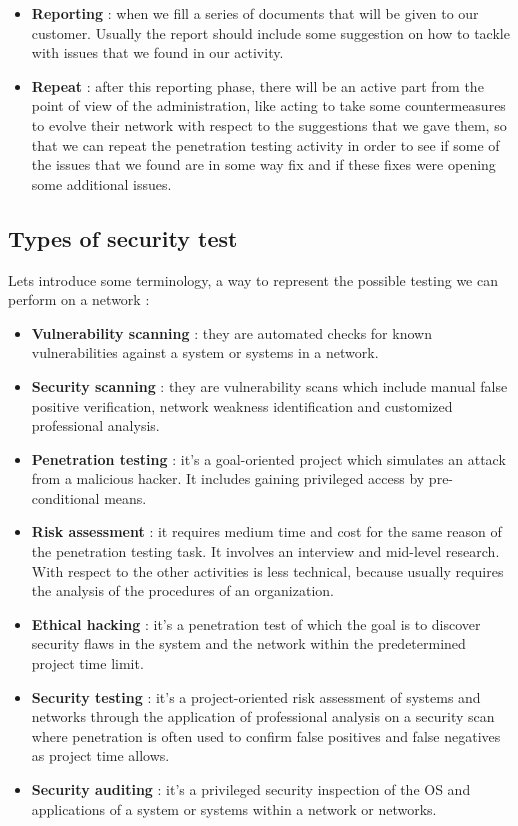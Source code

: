 \documentclass[11pt]{article}
\begin{document}
\begin{itemize}
\item \textbf{Reporting} : when we fill a series of documents that will be given to our customer. Usually the report should include some suggestion on how to tackle with issues that we found in our activity. 
\item \textbf{Repeat} : after this reporting phase, there will be an active part from the point of view of the administration, like acting to take some countermeasures to evolve their network with respect to the suggestions that we gave them, so that we can repeat the penetration testing activity in order to see if some of the issues that we found are in some way fix and if these fixes were opening some additional issues.
\end{itemize}
\subsection{Types of security test}
Lets introduce some terminology, a way to represent the possible testing we can perform on a network :
\begin{itemize}
\item \textbf{Vulnerability scanning} : they are automated checks for known vulnerabilities against a system or systems in a network.
\item \textbf{Security scanning} : they are vulnerability scans which include manual false positive verification, network weakness identification and customized professional analysis.
\item \textbf{Penetration testing} : it's a goal-oriented project which simulates an attack from a malicious hacker. It includes gaining privileged access by pre-conditional means.
\item \textbf{Risk assessment} : it requires medium time and cost for the same reason of the penetration testing task. It involves an interview and mid-level research. With respect to the other activities is less technical, because usually requires the analysis of the procedures of an organization.
\item \textbf{Ethical hacking} : it's a penetration test of which the goal is to discover security flaws in the system and the network within the predetermined project time limit.
\item \textbf{Security testing} : it's a project-oriented risk assessment of systems and networks through the application of professional analysis on a security scan where penetration is often used to confirm false positives and false negatives as project time allows.
\item \textbf{Security auditing} : it's a privileged security inspection of the OS and applications of a system or systems within a network or networks.
\end{itemize}
\end{document}
